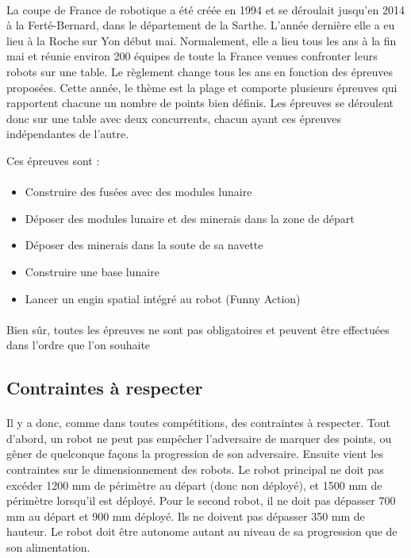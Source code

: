 \documentclass[12pt,a4paper]{article}
\begin{document}
\paragraph{}
La coupe de France de robotique a été créée en 1994 et se déroulait jusqu'en 2014 à la Ferté-Bernard, dans le 
département de la Sarthe. L'année dernière elle a eu lieu à la Roche sur Yon début  mai. Normalement, elle a lieu tous les ans à la fin mai et réunie environ 200 équipes de toute la France 
venues confronter leurs robots sur une table. Le règlement change tous les ans en fonction des épreuves proposées. 
Cette année, le thème est la plage et comporte plusieurs épreuves qui rapportent chacune un nombre de points 
bien définis. Les épreuves se déroulent donc sur une table avec deux concurrents, chacun ayant ces épreuves 
indépendantes de l'autre.  

Ces épreuves sont : 

\paragraph{}
\begin{itemize}
\item Construire des fusées avec des modules lunaire
\item Déposer des modules lunaire et des minerais dans la zone de départ
\item Déposer des minerais dans la soute de sa navette
\item Construire une base lunaire
\item Lancer un engin spatial intégré au robot (Funny Action)
\end{itemize} 

\paragraph{}
Bien sûr, toutes les épreuves ne sont pas obligatoires et peuvent être effectuées dans l'ordre que l'on souhaite  

\subsection{Contraintes à respecter}
\paragraph{}
Il y a donc, comme dans toutes compétitions, des contraintes à respecter. Tout d'abord, un robot ne peut pas 
empêcher l'adversaire de marquer des points, ou gêner de quelconque façons la progression de son adversaire. 
Ensuite vient les contraintes sur le dimensionnement des robots. Le robot principal ne doit pas excéder 1200 
mm de périmètre au départ (donc non déployé), et 1500 mm de périmètre lorsqu'il est déployé. Pour le second 
robot, il ne doit pas dépasser 700 mm au départ et 900 mm déployé. Ils ne doivent pas dépasser 350 mm de hauteur. 
Le robot doit être autonome autant au niveau de sa progression que de son alimentation. 
\end{document}
